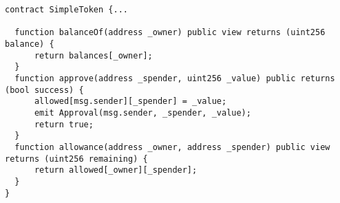 \begin{lstlisting}[language=Solidity]
contract SimpleToken {...

  function balanceOf(address _owner) public view returns (uint256 balance) {
      return balances[_owner];
  }
  function approve(address _spender, uint256 _value) public returns (bool success) {
      allowed[msg.sender][_spender] = _value;
      emit Approval(msg.sender, _spender, _value);
      return true;
  }
  function allowance(address _owner, address _spender) public view returns (uint256 remaining) {
      return allowed[_owner][_spender];
  }
}
\end{lstlisting}